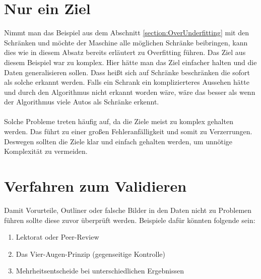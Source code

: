 \documentclass[12pt,oneside,a4paper,parskip]{scrbook}
\begin{document}
\section{Nur ein Ziel}
\label{section:oneGoal}
Nimmt man das Beispiel aus dem Abschnitt \ref{section:OverUnderfitting} mit den Schränken und möchte der Maschine alle möglichen Schränke beibringen, kann dies wie in diesem Absatz bereits erläutert zu Overfitting führen. Das Ziel aus diesem Beispiel war zu komplex. Hier hätte man das Ziel einfacher halten und die Daten generalisieren sollen. Dass heißt sich auf Schränke beschränken die sofort als solche erkannt werden. Falls ein Schrank ein komplizierteres Aussehen hätte und durch den Algorithmus nicht erkannt worden wäre, wäre das besser als wenn der Algorithmus viele Autos als Schränke erkennt. 
\\\\
Solche Probleme treten häufig auf, da die Ziele meist zu komplex gehalten werden. Das führt zu einer großen Fehleranfälligkeit und somit zu Verzerrungen. Deswegen sollten die Ziele klar und einfach gehalten werden, um unnötige Komplexität zu vermeiden.

\section{Verfahren zum Validieren}
\label{section:validate}

Damit Vorurteile, Outliner oder falsche Bilder in den Daten nicht zu Problemen führen sollte diese zuvor überprüft werden. Beispiele dafür könnten folgende sein:
\begin{enumerate}
	\item Lektorat oder Peer-Review
	\item Das Vier-Augen-Prinzip (gegenseitige Kontrolle)
	\item Mehrheitsentscheide bei unterschiedlichen Ergebnissen
\end{enumerate}
\end{document}
